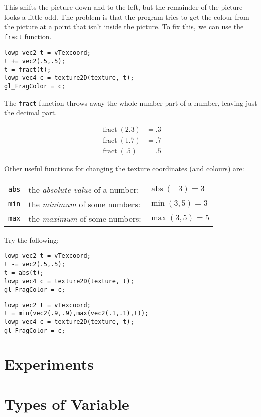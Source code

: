 \documentclass[
  html5,%
  mathml,%
  use filename%
]{internet}
\makeatletter
\DeclareMathOperator\fract{fract}
\DeclareMathOperator\abs{abs}
\let\prev@sec=\section
\renewcommand\section{\clearpage\prev@sec}
\makeatother
\begin{document}
This shifts the picture down and to the left, but the remainder of the picture looks a little odd.
The problem is that the program tries to get the colour from the picture at a point that isn't inside the picture.
To fix this, we can use the \verb!fract! function.

\begin{tcolorbox}
\begin{verbatim}
lowp vec2 t = vTexcoord;
t += vec2(.5,.5);
t = fract(t);
lowp vec4 c = texture2D(texture, t);
gl_FragColor = c;
\end{verbatim}
\end{tcolorbox}

The \verb!fract! function throws away the whole number part of a number, leaving just the decimal part.

\begin{align*}
\fract(2.3) &= .3 \\
\fract(1.7) &= .7 \\
\fract(.5) &= .5
\end{align*}

Other useful functions for changing the texture coordinates (and colours) are:

\begin{tabular}{rll}
\verb!abs! & the \emph{absolute value} of a number: & \(\abs(-3) = 3\) \\
\verb!min! & the \emph{minimum} of some numbers: & \(\min(3,5) = 3\) \\
\verb!max! & the \emph{maximum} of some numbers: & \(\max(3,5) = 5\)
\end{tabular}

Try the following:

\begin{tcolorbox}
\begin{verbatim}
lowp vec2 t = vTexcoord;
t -= vec2(.5,.5);
t = abs(t);
lowp vec4 c = texture2D(texture, t);
gl_FragColor = c;
\end{verbatim}
\end{tcolorbox}

\begin{tcolorbox}
\begin{verbatim}
lowp vec2 t = vTexcoord;
t = min(vec2(.9,.9),max(vec2(.1,.1),t));
lowp vec4 c = texture2D(texture, t);
gl_FragColor = c;
\end{verbatim}
\end{tcolorbox}

\section{Experiments}

\section{Types of Variable}
\end{document}
